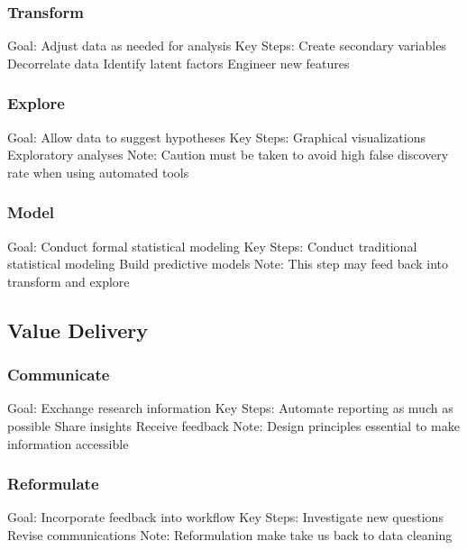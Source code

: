\documentclass[
]{book}
\begin{document}
\hypertarget{transform}{%
\subsubsection{Transform}\label{transform}}

Goal:
Adjust data as needed for analysis
Key Steps:
Create secondary variables
Decorrelate data
Identify latent factors
Engineer new features

\hypertarget{explore}{%
\subsubsection{Explore}\label{explore}}

Goal:
Allow data to suggest hypotheses
Key Steps:
Graphical visualizations
Exploratory analyses
Note:
Caution must be taken to avoid high false discovery rate when using automated tools

\hypertarget{model}{%
\subsubsection{Model}\label{model}}

Goal:
Conduct formal statistical modeling
Key Steps:
Conduct traditional statistical modeling
Build predictive models
Note:
This step may feed back into transform and explore

\hypertarget{value-delivery2}{%
\subsection{Value Delivery}\label{value-delivery2}}

\hypertarget{communicate}{%
\subsubsection{Communicate}\label{communicate}}

Goal:
Exchange research information
Key Steps:
Automate reporting as much as possible
Share insights
Receive feedback
Note:
Design principles essential to make information accessible

\hypertarget{reformulate}{%
\subsubsection{Reformulate}\label{reformulate}}

Goal:
Incorporate feedback into workflow
Key Steps:
Investigate new questions
Revise communications
Note:
Reformulation make take us back to data cleaning
\end{document}
